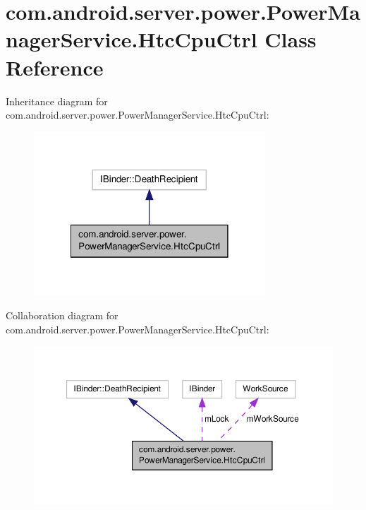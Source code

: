 \hypertarget{classcom_1_1android_1_1server_1_1power_1_1PowerManagerService_1_1HtcCpuCtrl}{\section{com.\-android.\-server.\-power.\-Power\-Manager\-Service.\-Htc\-Cpu\-Ctrl Class Reference}
\label{classcom_1_1android_1_1server_1_1power_1_1PowerManagerService_1_1HtcCpuCtrl}
}


Inheritance diagram for com.\-android.\-server.\-power.\-Power\-Manager\-Service.\-Htc\-Cpu\-Ctrl\-:
\nopagebreak
\begin{figure}[H]
\begin{center}
\leavevmode
\includegraphics[width=246pt]{classcom_1_1android_1_1server_1_1power_1_1PowerManagerService_1_1HtcCpuCtrl__inherit__graph}
\end{center}
\end{figure}


Collaboration diagram for com.\-android.\-server.\-power.\-Power\-Manager\-Service.\-Htc\-Cpu\-Ctrl\-:
\nopagebreak
\begin{figure}[H]
\begin{center}
\leavevmode
\includegraphics[width=350pt]{classcom_1_1android_1_1server_1_1power_1_1PowerManagerService_1_1HtcCpuCtrl__coll__graph}
\end{center}
\end{figure}
